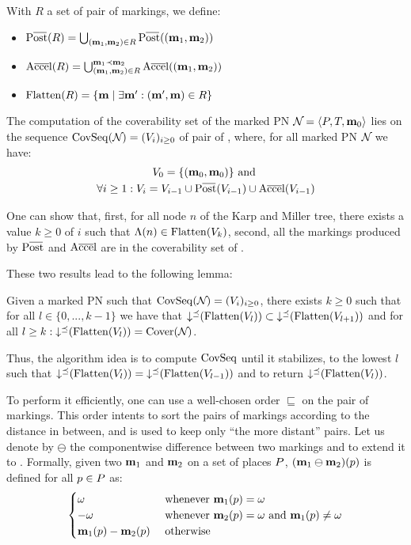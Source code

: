 With $R$ a set of pair of markings, we define:
\begin{itemize}
  \item $\Postb(R) = \bigcup_{(\mar_1, \mar_2) \in R} \Postb((\mar_1, \mar_2))$
  \item $\operatorname{A\overline{cce}l}(R) = \bigcup_{(\mathbf{m}_1, \mathbf{m}_2) \in R}^{\mathbf{m}_1 \prec \mathbf{m}_2} \operatorname{A\overline{cce}l}((\mathbf{m}_1, \mathbf{m}_2))$
  \item $\operatorname{Flatten}(R) = \{\mathbf{m} \mid \exists \mathbf{m}' : (\mathbf{m}', \mathbf{m}) \in R\}$
\end{itemize}

The computation of the coverability set of the marked \ac{PN} $\defPN$ lies on the sequence $\operatorname{CovSeq}(\mathcal{N}_{}) = (V_i)_{i \geq 0}$ of pair of \omarks, where, for all marked \ac{PN} $\mathcal{N}_{}$ we have:
\begin{gather*}
  V_0 = \{(\mari, \mari)\} \text{ and } \\
  \forall i \geq 1 : V_i = V_{i-1} \cup \Postb(V_{i-1}) \cup \Accelb(V_{i-1})
\end{gather*}

One can show that,
first, for all node $n$ of the Karp and Miller tree, there exists a value $k \geq 0$ of $i$ such that $\operatorname{\Lambda}(n) \in \operatorname{Flatten}(V_k)$,
second, all the markings produced by $\Postb$ and $\operatorname{A\overline{cce}l}$ are in the coverability set of \namePN.

These two results lead to the following lemma:
\begin{lemm}
  Given a marked \ac{PN} \namePN such that $\operatorname{CovSeq}(\mathcal{N}_{}) = (V_i)_{i \geq 0}$,
  there exists $k \geq 0$ such that for all $l \in \{0, ..., k-1\}$ we have that $\operatorname{\downarrow^\preceq}(\operatorname{Flatten}(V_l)) \subset \operatorname{\downarrow^\preceq}(\operatorname{Flatten}(V_{l+1}))$
  and for all $l \geq k : \operatorname{\downarrow^\preceq}(\operatorname{Flatten}(V_l)) = \operatorname{Cover}(\mathcal{N}_{})$.
\end{lemm}

Thus, the algorithm idea is to compute $\operatorname{CovSeq}$ until it stabilizes, \ie to the lowest $l$ such that $\operatorname{\downarrow^\preceq}(\operatorname{Flatten}(V_l)) = \operatorname{\downarrow^\preceq}(\operatorname{Flatten}(V_{l-1}))$ and to return $\operatorname{\downarrow^\preceq}(\operatorname{Flatten}(V_l))$.

To perform it efficiently, one can use a well-chosen order $\sqsubseteq$ on the pair of markings.
This order intents to sort the pairs of markings according to the distance in between, and is used to keep only ``the more distant'' pairs.
Let us denote by $\ominus$ the componentwise difference between two markings and to extend it to \omarks.
Formally, given two \omarks $\mathbf{m}_1$ and $\mathbf{m}_2$ on a set of places $P$, $(\mathbf{m}_1 \ominus \mathbf{m}_2)(p)$ is defined for all $p \in P$ as:
\[
  \begin{cases}
    \omega & \text{ whenever } \mathbf{m}_1(p) = \omega \\
    -\omega & \text{ whenever } \mathbf{m}_2(p) = \omega \text{ and } \mathbf{m}_1(p) \neq \omega \\
    \mathbf{m}_1(p) - \mathbf{m}_2(p) & \text{ otherwise}
  \end{cases}
\]

